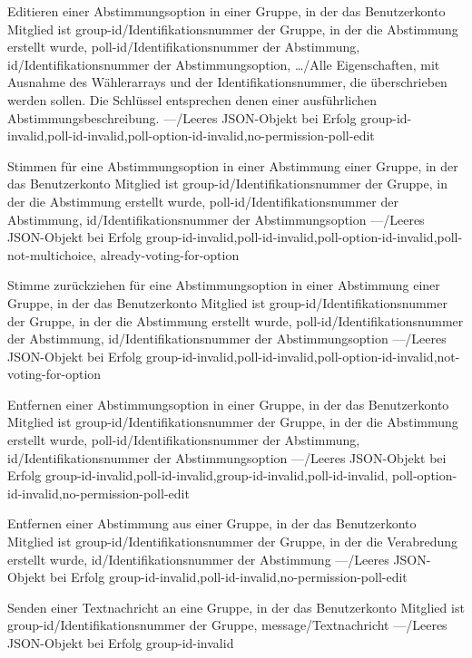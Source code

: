 \documentclass[parskip=full,11pt]{scrartcl}
\begin{document}
{Editieren einer Abstimmungsoption in einer Gruppe, in der das Benutzerkonto
Mitglied ist}
{group-id/Identifikationsnummer der Gruppe{,} in der die Abstimmung erstellt
wurde,
poll-id/Identifikationsnummer der Abstimmung,
id/Identifikationsnummer der Abstimmungsoption,
\dots/Alle Eigenschaften{,} mit Ausnahme des Wählerarrays und der
Identifikationsnummer{,} die überschrieben werden sollen.
Die Schlüssel entsprechen denen einer ausführlichen Abstimmungsbeschreibung.}
{---/Leeres JSON-Objekt bei Erfolg}
{group-id-invalid,poll-id-invalid,poll-option-id-invalid,no-permission-poll-edit}

{Stimmen für eine Abstimmungsoption in einer Abstimmung einer Gruppe,
in der das Benutzerkonto Mitglied ist}
{group-id/Identifikationsnummer der Gruppe{,} in der die Abstimmung erstellt
wurde,
poll-id/Identifikationsnummer der Abstimmung,
id/Identifikationsnummer der Abstimmungsoption}
{---/Leeres JSON-Objekt bei Erfolg}
{group-id-invalid,poll-id-invalid,poll-option-id-invalid,poll-not-multichoice,
already-voting-for-option}

{Stimme zurückziehen für eine Abstimmungsoption in einer Abstimmung
einer Gruppe, in der das Benutzerkonto Mitglied ist}
{group-id/Identifikationsnummer der Gruppe{,} in der die Abstimmung erstellt
wurde,
poll-id/Identifikationsnummer der Abstimmung,
id/Identifikationsnummer der Abstimmungsoption}
{---/Leeres JSON-Objekt bei Erfolg}
{group-id-invalid,poll-id-invalid,poll-option-id-invalid,not-voting-for-option}

{Entfernen einer Abstimmungsoption in einer Gruppe, in der das Benutzerkonto
Mitglied ist}
{group-id/Identifikationsnummer der Gruppe{,} in der die Abstimmung erstellt
wurde,
poll-id/Identifikationsnummer der Abstimmung,
id/Identifikationsnummer der Abstimmungsoption}
{---/Leeres JSON-Objekt bei Erfolg}
{group-id-invalid,poll-id-invalid,group-id-invalid,poll-id-invalid,
poll-option-id-invalid,no-permission-poll-edit}

{Entfernen einer Abstimmung aus einer Gruppe, in der das Benutzerkonto Mitglied
ist}
{group-id/Identifikationsnummer der Gruppe{,} in der die Verabredung erstellt
wurde,
id/Identifikationsnummer der Abstimmung}
{---/Leeres JSON-Objekt bei Erfolg}
{group-id-invalid,poll-id-invalid,no-permission-poll-edit}

{Senden einer Textnachricht an eine Gruppe, in der das Benutzerkonto Mitglied
ist}
{group-id/Identifikationsnummer der Gruppe,
message/Textnachricht} %
{---/Leeres JSON-Objekt bei Erfolg}
{group-id-invalid}
\end{document}
